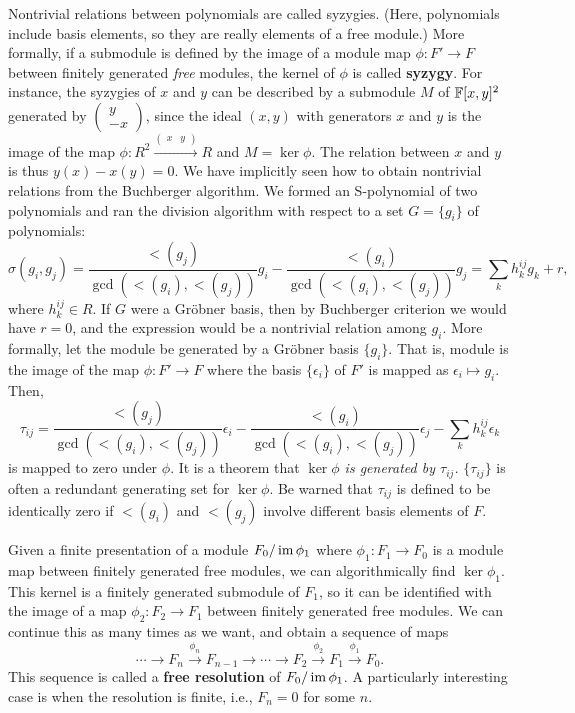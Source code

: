 Nontrivial relations between polynomials are called syzygies.
(Here, polynomials include basis elements, so they are really elements of a free module.)
More formally, if a submodule is defined by the image of a module map $\phi : F' \to F$
between finitely generated {\em free} modules, the kernel of $\phi$ is called {\bf syzygy}. 
For instance, the syzygies of $x$ and $y$ can be described by a submodule $M$ of $\mathbb{F}[x,y]^2$ 
generated by $\begin{pmatrix} y \\ -x \end{pmatrix}$,
since the ideal $(x,y)$ with generators $x$ and $y$ is the image of the map
$\phi : R^2 \xrightarrow{\begin{pmatrix} x & y \end{pmatrix}} R$ and $M = \ker \phi$.
The relation between $x$ and $y$ is thus $y(x) -x(y) = 0$.
We have implicitly seen how to obtain nontrivial relations from the Buchberger algorithm.
We formed an S-polynomial of two polynomials and ran the division algorithm with respect to a set $G=\{g_i\}$ of polynomials:
\[
 \sigma(g_i,g_j) = \frac{\lt(g_j)}{\gcd(\lt(g_i),\lt(g_j))} g_i - \frac{\lt(g_i)}{\gcd(\lt(g_i),\lt(g_j))} g_j = \sum_k h^{ij}_k g_k + r ,
\]
where $h^{ij}_k \in R$.
If $G$ were a Gr\"obner basis, then by Buchberger criterion we would have $r=0$, 
and the expression would be a nontrivial relation among $g_i$.
More formally, let the module be generated by a Gr\"obner basis $\{g_i\}$.
That is, module is the image of the map $\phi : F' \to F$
where the basis $\{\epsilon_i\}$ of $F'$ is mapped as $\epsilon_i \mapsto g_i$.
Then,
\[
\tau_{ij} = \frac{\lt(g_j)}{\gcd(\lt(g_i),\lt(g_j))} \epsilon_i - \frac{\lt(g_i)}{\gcd(\lt(g_i),\lt(g_j))} \epsilon_j - \sum_k h^{ij}_k \epsilon_k 
\]
is mapped to zero under $\phi$.
It is a theorem that {\em $\ker \phi$ is generated by $\tau_{ij}$.}
$\{\tau_{ij}\}$ is often a redundant generating set for $\ker \phi$.
Be warned that $\tau_{ij}$ is defined to be identically zero if $\lt(g_i)$ and $\lt(g_j)$ involve different basis elements of $F$.

Given a finite presentation of a module $F_0/\mathop{\mathrm{im}}\nolimits \phi_1$ where $\phi_1 : F_1 \to F_0$ is a module map 
between finitely generated free modules,
we can algorithmically find $\ker \phi_1$. This kernel is a finitely generated submodule of $F_1$, 
so it can be identified with the image of a map $\phi_2 : F_2 \to F_1$ between finitely generated free modules.
We can continue this as many times as we want, and obtain a sequence of maps
\[
\cdots \to F_n \xrightarrow{\phi_n} F_{n-1} \to \cdots \to F_2 \xrightarrow{\phi_2} F_1 \xrightarrow{\phi_1} F_0 .
\]
This sequence is called a {\bf free resolution} of $F_0/\mathop{\mathrm{im}}\nolimits \phi_1$.
A particularly interesting case is when the resolution is finite, i.e., $F_n =0$ for some $n$.



